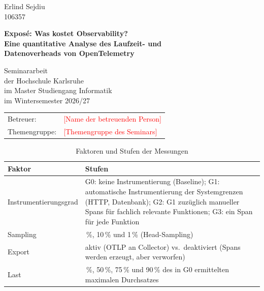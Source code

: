 \documentclass[11pt]{article}
\newcommand{\offen}[1]{\textcolor{red}{[#1]}}
\begin{document}
\begin{titlepage}
    \raggedright
    Erlind Sejdiu\\
    106357
    \vspace*{3cm}

    \begin{center}
        {\LARGE\bfseries Exposé: Was kostet Observability?\\[0.3em]
        Eine quantitative Analyse des Laufzeit- und\\[0.3em]
        Datenoverheads von OpenTelemetry\par}
        \vspace{2cm}
        {\large Seminararbeit\\
        der Hochschule Karlsruhe\\
        im Master Studiengang Informatik\\
        im Wintersemester 2026/27\par}
    \end{center}
    \vfill
    \begin{tabular}{@{}ll}
        Betreuer: & \offen{Name der betreuenden Person}\\
        Themengruppe: & \offen{Themengruppe des Seminars}
    \end{tabular}
\end{titlepage}

\tableofcontents
\newpage


\begin{table}[h]
\centering
\begin{tabularx}{\textwidth}{@{}l>{\raggedright\arraybackslash}X@{}}
\toprule
\textbf{Faktor} & \textbf{Stufen} \\
\midrule
Instrumentierungsgrad & G0: keine Instrumentierung (Baseline);\newline
G1: automatische Instrumentierung der Systemgrenzen (HTTP, Datenbank);\newline
G2: G1 zuzüglich manueller Spans für fachlich relevante Funktionen;\newline
G3: ein Span für jede Funktion \\
\addlinespace
Sampling & 100\,\%, 10\,\% und 1\,\% (Head-Sampling) \\
\addlinespace
Export & aktiv (OTLP an Collector) vs.\ deaktiviert (Spans werden erzeugt, aber verworfen) \\
\addlinespace
Last & 25\,\%, 50\,\%, 75\,\% und 90\,\% des in G0 ermittelten maximalen Durchsatzes \\
\bottomrule
\end{tabularx}
\caption{Faktoren und Stufen der Messungen}
\end{table}
\end{document}
